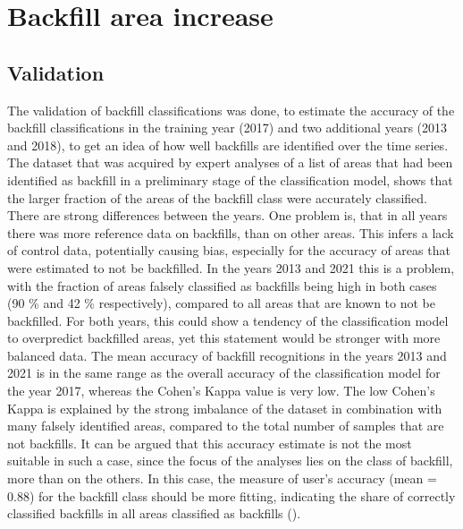 \documentclass[11pt, A4, oneside]{report}
\begin{document}
\section{Backfill area increase}
\subsection{Validation}
The validation of backfill classifications was done, to estimate the accuracy of the backfill classifications in the training year (2017) and two additional years (2013 and 2018), to get an idea of how well backfills are identified over the time series. The dataset that was acquired by expert analyses of a list of areas that had been identified as backfill in a preliminary stage of the classification model, shows that the larger fraction of the areas of the backfill class were accurately classified. There are strong differences between the years. One problem is, that in all years there was more reference data on backfills, than on other areas. This infers a lack of control data, potentially causing bias, especially for the accuracy of areas that were estimated to not be backfilled. In the years 2013 and 2021 this is a problem, with the fraction of areas falsely classified as backfills being high in both cases (90 \% and 42 \% respectively), compared to all areas that are known to not be backfilled. For both years, this could show a tendency of the classification model to overpredict backfilled areas, yet this statement would be stronger with more balanced data. The mean accuracy of backfill recognitions in the years 2013 and 2021 is in the same range as the overall accuracy of the classification model for the year 2017, whereas the Cohen's Kappa value is very low. The low Cohen's Kappa is explained by the strong imbalance of the dataset in combination with many falsely identified areas, compared to the total number of samples that are not backfills. It can be argued that this accuracy estimate is not the most suitable in such a case, since the focus of the analyses lies on the class of backfill, more than on the others. In this case, the measure of user's accuracy (mean = 0.88) for the backfill class should be more fitting, indicating the share of correctly classified backfills in all areas classified as backfills (\cite{Olofsson.2014, Strahler.2006}).

\end{document}
